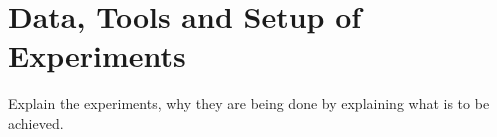 \section{Data, Tools and Setup of Experiments}
Explain the experiments, why they are being done by explaining
what is to be achieved.

